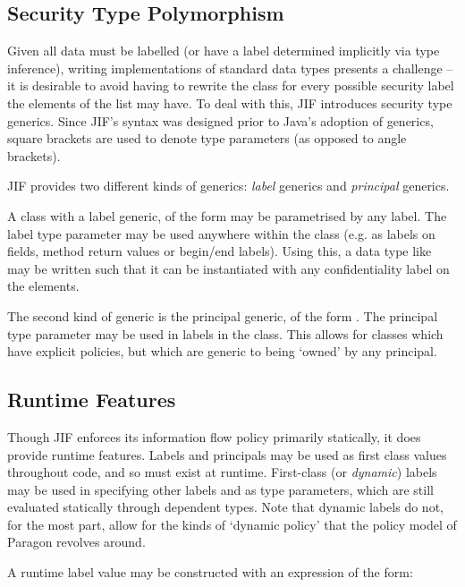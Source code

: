 \subsection{Security Type Polymorphism}

Given all data must be labelled (or have a label determined implicitly via type inference), writing implementations of standard data types presents a challenge -- it is desirable to avoid having to rewrite the  class for every possible security label the elements of the list may have. To deal with this, JIF introduces security type generics. Since JIF's syntax was designed prior to Java's adoption of generics, square brackets are used to denote type parameters (as opposed to angle brackets).

JIF provides two different kinds of generics: \textit{label} generics and \textit{principal} generics.

A class with a label generic, of the form  may be parametrised by any label. The label type parameter may be used anywhere within the class (e.g. as labels on fields, method return values or begin/end labels). Using this, a data type like  may be written such that it can be instantiated with any confidentiality label on the elements.

The second kind of generic is the principal generic, of the form . The principal type parameter may be used in labels in the class. This allows for classes which have explicit policies, but which are generic to being `owned' by any principal.

\subsection{Runtime Features}

Though JIF enforces its information flow policy primarily statically, it does provide runtime features. Labels and principals may be used as first class values throughout code, and so must exist at runtime. First-class (or \textit{dynamic}) labels may be used in specifying other labels and as type parameters, which are still evaluated statically through dependent types. Note that dynamic labels do not, for the most part, allow for the kinds of `dynamic policy' that the policy model of Paragon revolves around.

A runtime label value may be constructed with an expression of the form:


